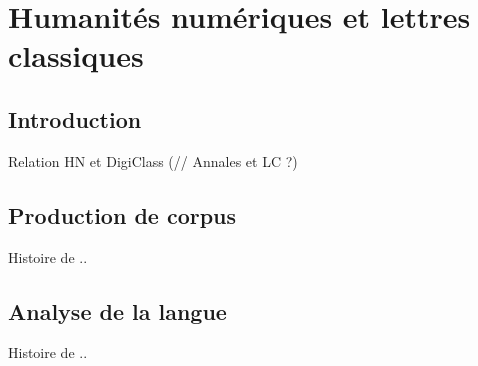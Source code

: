 \section{Humanités numériques et lettres classiques}
\label{sec:digitalclassics}

\subsection{Introduction}
\label{subsec:dc_intro}

Relation HN et DigiClass (// Annales et LC ?)

\subsection{Production de corpus}
\label{subsec:dc_histoirecorpus}

Histoire de ..

\subsection{Analyse de la langue}
\label{subsec:dc_langue}

Histoire de ..
